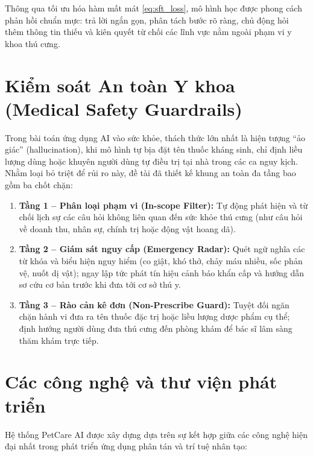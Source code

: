 Thông qua tối ưu hóa hàm mất mát \cref{eq:sft_loss}, mô hình học được phong cách phản hồi chuẩn mực: trả lời ngắn gọn, phân tách bước rõ ràng, chủ động hỏi thêm thông tin thiếu và kiên quyết từ chối các lĩnh vực nằm ngoài phạm vi y khoa thú cưng.

\section{Kiểm soát An toàn Y khoa (Medical Safety Guardrails)}
\label{sec:guardrails}

Trong bài toán ứng dụng AI vào sức khỏe, thách thức lớn nhất là hiện tượng ``ảo giác'' (hallucination), khi mô hình tự bịa đặt tên thuốc kháng sinh, chỉ định liều lượng dùng hoặc khuyên người dùng tự điều trị tại nhà trong các ca nguy kịch. Nhằm loại bỏ triệt để rủi ro này, đề tài đã thiết kế khung an toàn đa tầng bao gồm ba chốt chặn:

\begin{enumerate}[label=\arabic*.]
    \item \textbf{Tầng 1 -- Phân loại phạm vi (In-scope Filter):} Tự động phát hiện và từ chối lịch sự các câu hỏi không liên quan đến sức khỏe thú cưng (như câu hỏi về doanh thu, nhân sự, chính trị hoặc động vật hoang dã).
    \item \textbf{Tầng 2 -- Giám sát nguy cấp (Emergency Radar):} Quét ngữ nghĩa các từ khóa và biểu hiện nguy hiểm (co giật, khó thở, chảy máu nhiều, sốc phản vệ, nuốt dị vật); ngay lập tức phát tín hiệu cảnh báo khẩn cấp và hướng dẫn sơ cứu cơ bản trước khi đưa tới cơ sở thú y.
    \item \textbf{Tầng 3 -- Rào cản kê đơn (Non-Prescribe Guard):} Tuyệt đối ngăn chặn hành vi đưa ra tên thuốc đặc trị hoặc liều lượng dược phẩm cụ thể; định hướng người dùng đưa thú cưng đến phòng khám để bác sĩ lâm sàng thăm khám trực tiếp.
\end{enumerate}

\section{Các công nghệ và thư viện phát triển}
\label{sec:congnghe}

Hệ thống PetCare AI được xây dựng dựa trên sự kết hợp giữa các công nghệ hiện đại nhất trong phát triển ứng dụng phân tán và trí tuệ nhân tạo:

